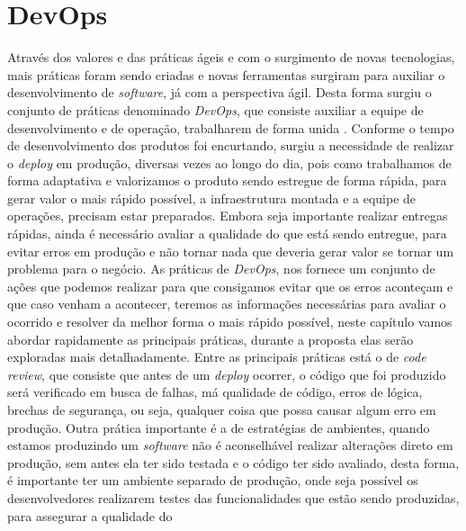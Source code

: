     \chapter{DevOps}
      Através dos valores e das práticas ágeis e com o surgimento de novas
      tecnologias, mais práticas foram sendo criadas e novas ferramentas surgiram
      para auxiliar o desenvolvimento de \textit{software}, já com a perspectiva
      ágil. Desta forma surgiu o conjunto de práticas denominado \textit{DevOps},
      que consiste auxiliar a equipe de desenvolvimento e de operação, trabalharem de
      forma unida \cite{TheDevOpsHandbook}. Conforme o tempo de desenvolvimento
      dos produtos foi encurtando, surgiu a necessidade de realizar o \textit{deploy}
      em produção, diversas vezes ao longo do dia, pois como trabalhamos de forma
      adaptativa e valorizamos o produto sendo estregue de forma rápida, para gerar
      valor o mais rápido possível, a infraestrutura montada e a equipe de operações,
      precisam estar preparados. Embora seja importante realizar entregas rápidas,
      ainda é necessário avaliar a qualidade do que está sendo entregue, para
      evitar erros em produção e não tornar nada que deveria gerar valor se
      tornar um problema para o negócio. \newline
      As práticas de \textit{DevOps}, nos fornece um conjunto de ações que podemos
      realizar para que consigamos evitar que os erros aconteçam e que caso venham
      a acontecer, teremos as informações necessárias para avaliar o ocorrido e
      resolver da melhor forma o mais rápido possível, neste capítulo vamos abordar
      rapidamente as principais práticas, durante a proposta elas serão exploradas
      mais detalhadamente. \newline
      Entre as principais práticas está o de \textit{code review}, que consiste
      que antes de um \textit{deploy} ocorrer, o código que foi produzido será
      verificado em busca de falhas, má qualidade de código, erros de lógica,
      brechas de segurança, ou seja, qualquer coisa que possa causar algum erro
      em produção. Outra prática importante é a de estratégias de ambientes,
      quando estamos produzindo um \textit{software} não é aconselhável realizar
      alterações direto em produção, sem antes ela ter sido testada e o código
      ter sido avaliado, desta forma, é importante ter um ambiente separado de
      produção, onde seja possível os desenvolvedores realizarem testes das
      funcionalidades que estão sendo produzidas, para assegurar a qualidade do
